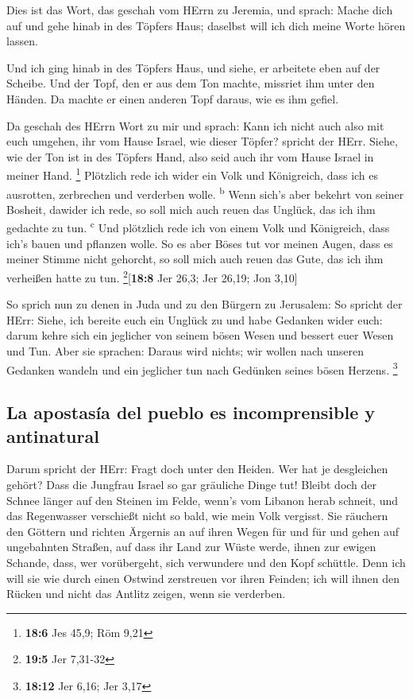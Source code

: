  Dies ist das Wort, das geschah vom HErrn zu Jeremia, und
sprach:  Mache dich auf und gehe hinab in des Töpfers
Haus; daselbst will ich dich meine Worte hören lassen.

 Und ich ging hinab in des Töpfers Haus, und siehe, er
arbeitete eben auf der Scheibe.  Und der Topf, den er aus
dem Ton machte, missriet ihm unter den Händen. Da machte er einen
anderen Topf daraus, wie es ihm gefiel.

 Da geschah des HErrn Wort zu mir und sprach:
 Kann ich nicht auch also mit euch umgehen, ihr vom Hause
Israel, wie dieser Töpfer? spricht der HErr. Siehe, wie der Ton ist in
des Töpfers Hand, also seid auch ihr vom Hause Israel in meiner Hand.
\footnote{\textbf{18:6} Jes 45,9; Röm 9,21}  Plötzlich
rede ich wider ein Volk und Königreich, dass ich es ausrotten,
zerbrechen und verderben wolle. \textsuperscript{b}  Wenn
sich's aber bekehrt von seiner Bosheit, dawider ich rede, so soll mich
auch reuen das Unglück, das ich ihm gedachte zu tun. \textsuperscript{c}
 Und plötzlich rede ich von einem Volk und Königreich,
dass ich's bauen und pflanzen wolle.  So es aber Böses
tut vor meinen Augen, dass es meiner Stimme nicht gehorcht, so soll mich
auch reuen das Gute, das ich ihm verheißen hatte zu tun.
\footnote{\textbf{19:5} Jer 7,31-32}{[}\textbf{18:8} Jer 26,3; Jer
26,19; Jon 3,10{]}

 So sprich nun zu denen in Juda und zu den Bürgern zu
Jerusalem: So spricht der HErr: Siehe, ich bereite euch ein Unglück zu
und habe Gedanken wider euch: darum kehre sich ein jeglicher von seinem
bösen Wesen und bessert euer Wesen und Tun.  Aber sie
sprachen: Daraus wird nichts; wir wollen nach unseren Gedanken wandeln
und ein jeglicher tun nach Gedünken seines bösen Herzens. \footnote{\textbf{18:12}
  Jer 6,16; Jer 3,17}

\hypertarget{la-apostasuxeda-del-pueblo-es-incomprensible-y-antinatural}{%
\subsection{La apostasía del pueblo es incomprensible y
antinatural}\label{la-apostasuxeda-del-pueblo-es-incomprensible-y-antinatural}}

 Darum spricht der HErr: Fragt doch unter den Heiden. Wer
hat je desgleichen gehört? Dass die Jungfrau Israel so gar gräuliche
Dinge tut!  Bleibt doch der Schnee länger auf den Steinen
im Felde, wenn's vom Libanon herab schneit, und das Regenwasser
verschießt nicht so bald, wie mein Volk vergisst.  Sie
räuchern den Göttern und richten Ärgernis an auf ihren Wegen für und für
und gehen auf ungebahnten Straßen,  auf dass ihr Land zur
Wüste werde, ihnen zur ewigen Schande, dass, wer vorübergeht, sich
verwundere und den Kopf schüttle.  Denn ich will sie wie
durch einen Ostwind zerstreuen vor ihren Feinden; ich will ihnen den
Rücken und nicht das Antlitz zeigen, wenn sie verderben.

